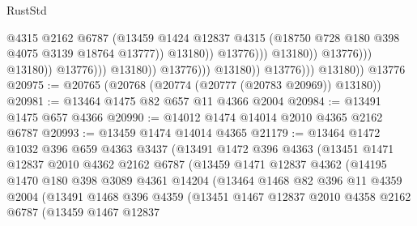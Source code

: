 \begin{lexlean}{RustStd}
\begin{coremodule}
{\begin{coremodule}
{{{{{{{{{{{{{{{{{{{{{{{{{{{{{{{                                                          @4315
                                                          @2162
                                                          @6787
                                                          (@13459
                                                            @1424
                                                            @12837
                                                            @4315
                                                            (@18750
                                                              @728
                                                              @180
                                                              @398
                                                              @4075
                                                              @3139
                                                              @18764
                                                              @13777))
                                                          @13180))
                                                      @13776)))
                                                @13180))
                                            @13776)))
                                      @13180))
                                  @13776)))
                            @13180))
                        @13776)))
                  @13180))
              @13776)))
        @13180))
    @13776
@20975 := @20765 (@20768 (@20774 (@20777 (@20783 @20969)) @13180))
@20981 := @13464 @1475 @82 @657 @11 @4366 @2004
@20984 := @13491 @1475 @657 @4366
@20990 := @14012 @1474 @14014 @2010 @4365 @2162 @6787
@20993 := @13459 @1474 @14014 @4365
@21179 := @13464
    @1472
    @1032
    @396
    @659
    @4363
    @3437
    (@13491
      @1472
      @396
      @4363
      (@13451
        @1471
        @12837
        @2010
        @4362
        @2162
        @6787
        (@13459
          @1471
          @12837
          @4362
          (@14195
            @1470
            @180
            @398
            @3089
            @4361
            @14204
            (@13464
              @1468
              @82
              @396
              @11
              @4359
              @2004
              (@13491
                @1468
                @396
                @4359
                (@13451
                  @1467
                  @12837
                  @2010
                  @4358
                  @2162
                  @6787
                  (@13459
                    @1467
                    @12837
}}}}}}}}}}}}}}}}}}}}}}}}}}}}}}}
\end{coremodule}}
\end{coremodule}
\end{lexlean}
